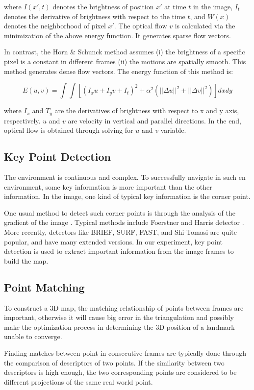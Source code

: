 \documentclass[conference]{IEEEtran}
\begin{document}
where $I(x',t)$ denotes the brightness of position $x'$ at time $t$ in the image, $I_t$ denotes the derivative of brightness with respect to the time $t$, and $W(x)$ denotes the neighborhood of pixel $x'$. The optical flow $v$ is calculated via the minimization of the above energy function. It generates sparse flow vectors.

In contrast, the Horn \& Schunck method assumes (i) the brightness of a specific pixel is a constant in different frames (ii) the motions are spatially smooth. This method generates dense flow vectors. The energy function of this method is:

\begin{equation}
	E(u,v) = \int\int[(I_xu + I_yv + I_t)^2+\alpha^2(||\Delta u ||^2 + ||\Delta v ||^2)]dxdy
\end{equation} 

where $I_x$ and $T_y$ are the derivatives of brightness with respect to x and y axis, respectively. $u$ and $v$ are velocity in vertical and parallel directions. In the end, optical flow is obtained through solving for $u$ and $v$ variable.		

\subsection{Key Point Detection}
The environment is continuous and complex. To successfully navigate in such en environment, some key information is more important than the other information. In the image, one kind of typical key information is the corner point. 

One usual method to detect such corner points is through the analysis of the gradient of the image \cite{gradient}. Typical methods include Foerstner and Harris detector \cite{detector}. More recently, detectors like BRIEF, SURF, FAST, and Shi-Tomasi are quite popular, and have many extended versions. In our experiment, key point detection is used to extract important information from the image frames to build the map.

\subsection{Point Matching}
To construct a 3D map, the matching relationship of points between frames are important, otherwise it will cause big error in the triangulation and possibly make the optimization process in determining the 3D position of a landmark unable to converge.

Finding matches between point in consecutive frames are typically done through the comparison of descriptors of two points. If the similarity between two descriptors is high enough, the two corresponding points are considered to be different projections of the same real world point. 
\end{document}
